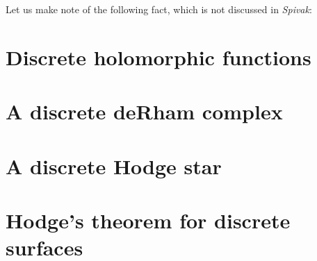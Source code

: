 \documentclass[aps,pra,showpacs,notitlepage,onecolumn,superscriptaddress,nofootinbib]{revtex4-1}
\theoremstyle{definition}
\begin{document}
\noindent Let us make note of the following fact, which is not discussed in \emph{Spivak}:

\begin{proposition}

  \end{proposition}

\section{Discrete holomorphic functions}

\section{A discrete deRham complex}

\section{A discrete Hodge star}

\section{Hodge's theorem for discrete surfaces}
\end{document}
